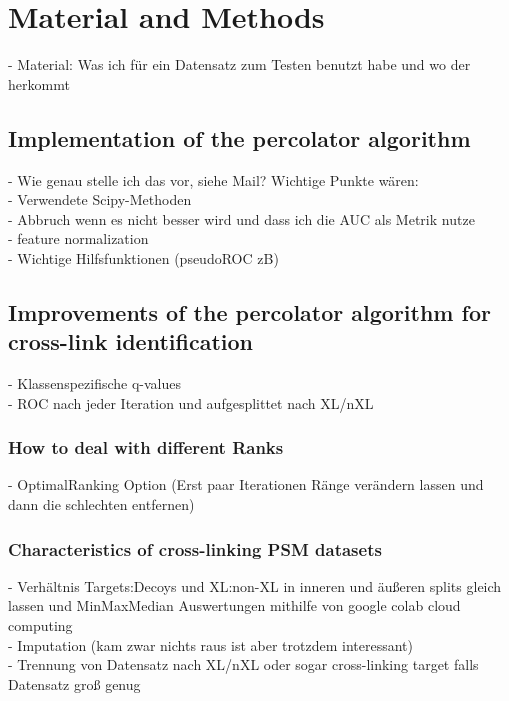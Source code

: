 
\chapter{Material and Methods}
\label{matmet}

- Material: Was ich für ein Datensatz zum Testen benutzt habe und wo der herkommt

\section{Implementation of the percolator algorithm}
- Wie genau stelle ich das vor, siehe Mail? Wichtige Punkte wären:\\
- Verwendete Scipy-Methoden\\
- Abbruch wenn es nicht besser wird und dass ich die AUC als Metrik nutze\\
- feature normalization\\
- Wichtige Hilfsfunktionen (pseudoROC zB)

\section{Improvements of the percolator algorithm for cross-link identification}
- Klassenspezifische q-values\\
- ROC nach jeder Iteration und aufgesplittet nach XL/nXL\\
\subsection{How to deal with different Ranks}
- OptimalRanking Option (Erst paar Iterationen Ränge verändern lassen und dann die schlechten entfernen)\\
\subsection{Characteristics of cross-linking PSM datasets}
- Verhältnis Targets:Decoys und XL:non-XL in inneren und äußeren splits gleich lassen und MinMaxMedian Auswertungen mithilfe von google colab cloud computing\\
- Imputation (kam zwar nichts raus ist aber trotzdem interessant)\\
- Trennung von Datensatz nach XL/nXL oder sogar cross-linking target falls Datensatz groß genug\\
